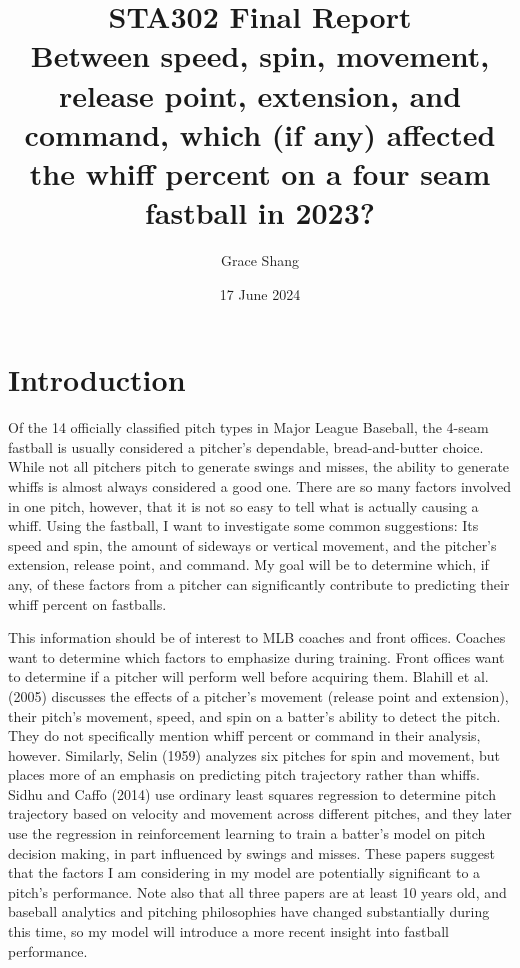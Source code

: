 \documentclass[12pt]{article}
\title{\huge{\textbf{STA302 Final Report}} \\
\LARGE{Between speed, spin, movement, release point, extension, and command, which (if any) affected the whiff percent on a four seam fastball in 2023?}}
\author{Grace Shang}
\date{17 June 2024}
\begin{document}
\clearpage\maketitle
\thispagestyle{empty}

\newpage
\setcounter{page}{1}
\tableofcontents

\newpage
{} %

\section{Introduction}
Of the 14 officially classified pitch types in Major League Baseball, the 4-seam fastball is usually considered a pitcher's dependable, bread-and-butter choice. While not all pitchers pitch to generate swings and misses, the ability to generate whiffs is almost always considered a good one. There are so many factors involved in one pitch, however, that it is not so easy to tell what is actually causing a whiff. Using the fastball, I want to investigate some common suggestions: Its speed and spin, the amount of sideways or vertical movement, and the pitcher's extension, release point, and command. My goal will be to determine which, if any, of these factors from a pitcher can significantly contribute to predicting their whiff percent on fastballs. 

\medskip

This information should be of interest to MLB coaches and front offices. Coaches want to determine which factors to emphasize during training. Front offices want to determine if a pitcher will perform well before acquiring them. Blahill et al. (2005) discusses the effects of a pitcher's movement (release point and extension), their pitch's movement, speed, and spin on a batter's ability to detect the pitch. They do not specifically mention whiff percent or command in their analysis, however. Similarly, Selin (1959) analyzes six pitches for spin and movement, but places more of an emphasis on predicting pitch trajectory rather than whiffs. Sidhu and Caffo (2014) use ordinary least squares regression to determine pitch trajectory based on velocity and movement across different pitches, and they later use the regression in reinforcement learning to train a batter's model on pitch decision making, in part influenced by swings and misses. These papers suggest that the factors I am considering in my model are potentially significant to a pitch's performance. Note also that all three papers are at least 10 years old, and baseball analytics and pitching philosophies have changed substantially during this time, so my model will introduce a more recent insight into fastball performance. 
\end{document}
